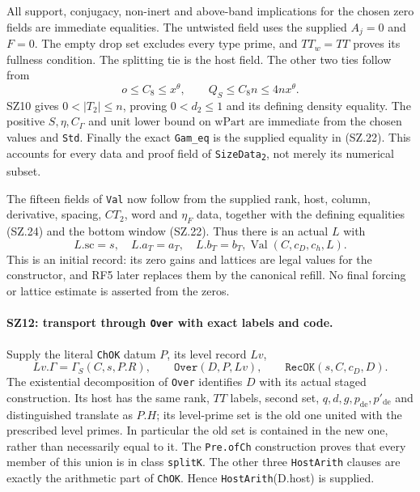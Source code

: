 All support, conjugacy, non-inert and above-band implications for
the chosen zero fields are immediate equalities. The untwisted field
uses the supplied $A_j=0$ and $F=0$. The empty drop set excludes
every type prime, and $TT_w=TT$ proves its fullness condition.
The splitting tie is the host field. The other two ties follow from
\[
 o\leq C_8\leq x^\theta,\qquad
             Q_S\leq C_8n\leq4nx^\theta.
\]
SZ10 gives $0<|T_2|\leq n$, proving $0<d_2\leq1$ and its
defining density equality. The positive $S,\eta,C_\Gamma$ and
unit lower bound on $\mathrm{wPart}$ are immediate from the chosen
values and \texttt{Std}. Finally the exact
\texttt{Gam\_eq} is the supplied equality in (SZ.22).
This accounts for every data and proof field of
\texttt{SizeData\textsubscript{2}}, not merely its numerical subset.

The fifteen fields of \texttt{Val} now follow from the supplied rank,
host, column, derivative, spacing, $CT_2$, word and $\eta_F$ data,
together with the defining equalities (SZ.24) and the bottom window
(SZ.22). Thus there is an actual $L$ with
\[
      L.\mathrm{sc}=s,\quad L.a_T=a_T,\quad L.b_T=b_T,
                         \operatorname{Val}(C,c_D,c_h,L).       \tag{SZ.25}
\]
This is an initial record: its zero gains and lattices are legal
values for the constructor, and RF5 later replaces them by the
canonical refill. No final forcing or lattice estimate is asserted
from the zeros.

\paragraph{SZ12: transport through \texttt{Over} with exact labels and code.}
Supply the literal \texttt{ChOK} datum $P$, its level record $Lv$,
\[
 Lv.\Gamma=\Gamma_S(C,s,P.R),\qquad
             \texttt{Over}(D,P,Lv),\qquad\texttt{RecOK}(s,C,c_D,D).
                                                                    \tag{SZ.26}
\]
The existential decomposition of \texttt{Over} identifies $D$ with
its actual staged construction. Its host has the same rank, $TT$
labels, second set, $q,d,g,p_{\mathrm{de}},p'_{\mathrm{de}}$ and
distinguished translate as $P.H$; its level-prime set is the old
one united with the prescribed level primes. In particular the old
set is contained in the new one, rather than necessarily equal to it.
The \texttt{Pre.ofCh} construction proves that every member of this
union is in class \texttt{splitK}. The other three
\texttt{HostArith} clauses are exactly the arithmetic part of
\texttt{ChOK}. Hence \texttt{HostArith}(D.host) is supplied.

